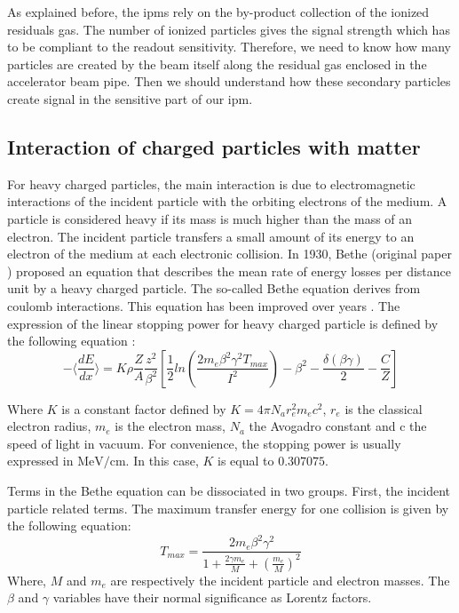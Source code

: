 \begin{refsection}
	As explained before, the \acrshort{ipm}s rely on the by-product collection of the ionized residuals gas. The number of ionized particles gives the signal strength which has to be compliant to the readout sensitivity. Therefore, we need to know how many particles are created by the beam itself along the residual gas enclosed in the accelerator beam pipe. Then we should understand how these secondary particles create signal in the sensitive part of our \acrshort{ipm}.


	\subsection{Interaction of charged particles with matter}
	For heavy charged particles, the main interaction is due to electromagnetic interactions of the incident particle with the orbiting electrons of the medium. A particle is considered heavy if its mass is much higher than the mass of an electron. The incident particle transfers a small amount of its energy to an electron of the medium at each electronic collision. In 1930, Bethe (original paper \cite{Bethe1930}) proposed an equation that describes the mean rate of energy losses per distance unit by a heavy charged particle. The so-called Bethe equation derives from coulomb interactions. This equation has been improved over years \cite{Fermi1940,Fano1963}. The expression of the linear stopping power for heavy charged particle is defined by the following equation \cite[p. 446]{Tanabashi2018}:
	\begin{equation}
		- \bigg \langle \frac{dE}{dx} \bigg \rangle =K \rho \frac{Z}{A} \frac{z^{2}}{\beta^{2}} \left[\frac{1}{2} ln \left(\frac{2 m_{e} \beta^{2} \gamma^{2} T_{max}}{I^{2}} \right) - \beta^{2} - \frac{\delta(\beta \gamma)}{2} - \frac{C}{Z} \right]
	\end{equation}

	Where \(K\) is a constant factor defined by \(K=4 \pi N_{a} r_{e}^{2} m_{e} c^{2}\), \(r_{e}\) is the classical electron radius, \(m_{e}\) is the electron mass, \(N_{a}\) the Avogadro constant and c the speed of light in vacuum. For convenience, the stopping power is usually expressed in \(\mathrm{MeV/cm}\). In this case, \(K\) is equal to \(0.307075\).

	Terms in the Bethe equation can be dissociated in two groups. First, the incident particle related terms. The maximum transfer energy for one collision is given by the following equation:
	\begin{equation}
		T_{max} = \frac{2 m_{e} \beta^{2} \gamma^{2}}{1 + \frac{2 \gamma m_{e} }{M} + \left( \frac{m_{e}}{M} \right)^{2}}
	\end{equation}
	Where, \(M\) and \(m_{e}\) are respectively the incident particle and electron masses. The \(\beta\) and \(\gamma\) variables have their normal significance as Lorentz factors.


\end{refsection}
